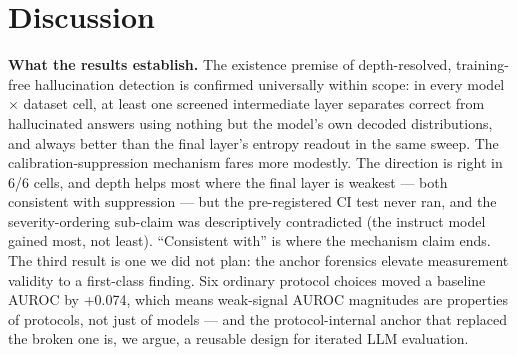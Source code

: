 \section{Discussion}
\label{sec:discussion}

\textbf{What the results establish.} The existence premise of depth-resolved, training-free hallucination detection is confirmed universally within scope: in every model $\times$ dataset cell, at least one screened intermediate layer separates correct from hallucinated answers using nothing but the model's own decoded distributions, and always better than the final layer's entropy readout in the same sweep. The calibration-suppression mechanism fares more modestly. The direction is right in 6/6 cells, and depth helps most where the final layer is weakest --- both consistent with suppression --- but the pre-registered CI test never ran, and the severity-ordering sub-claim was descriptively contradicted (the instruct model gained most, not least). ``Consistent with'' is where the mechanism claim ends. The third result is one we did not plan: the anchor forensics elevate measurement validity to a first-class finding. Six ordinary protocol choices moved a baseline AUROC by +0.074, which means weak-signal AUROC magnitudes are properties of protocols, not just of models --- and the protocol-internal anchor that replaced the broken one is, we argue, a reusable design for iterated LLM evaluation.

